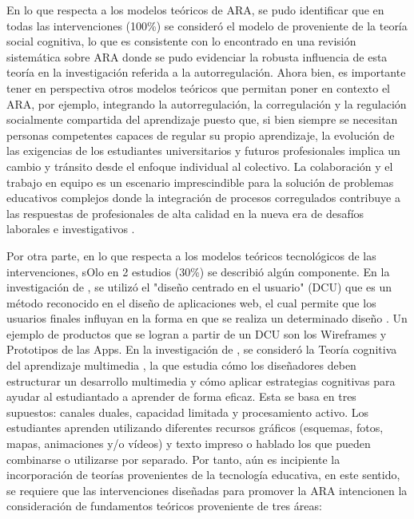 \documentclass[spanish]{textolivre}
\begin{document}
En lo que respecta a los modelos teóricos de ARA, se pudo identificar que en todas las intervenciones (100\%) se consideró el modelo de \textcite{zimmerman2000attaining} proveniente de la teoría social cognitiva, lo que es consistente con lo encontrado en una revisión sistemática sobre ARA donde se pudo evidenciar la robusta influencia de esta teoría en la investigación referida a la autorregulación. Ahora bien, es importante tener en perspectiva otros modelos teóricos que permitan poner en contexto el ARA, por ejemplo, integrando la autorregulación, la corregulación y la regulación socialmente compartida del aprendizaje puesto que, si bien siempre se necesitan personas competentes capaces de regular su propio aprendizaje, la evolución de las exigencias de los estudiantes universitarios y futuros profesionales implica un cambio y tránsito desde el enfoque individual al colectivo. La colaboración y el trabajo en equipo es un escenario imprescindible para la solución de problemas educativos complejos donde la integración de procesos corregulados contribuye a las respuestas de profesionales de alta calidad en la nueva era de desafíos laborales e investigativos \cite{bransen2022putting}. 

Por otra parte, en lo que respecta a los modelos teóricos tecnológicos de las intervenciones, sOlo en 2 estudios (30\%) se describió algún componente. En la investigación de \textcite{lobos2021design}, se utilizó el "diseño centrado en el usuario" (DCU) que es un método reconocido en el diseño de aplicaciones web, el cual permite que los usuarios finales influyan en la forma en que se realiza un determinado diseño \cite{williams2009user}. Un ejemplo de productos que se logran a partir de un DCU son los Wireframes y Prototipos de las Apps. En la investigación de \textcite{van2020new}, se consideró la Teoría cognitiva del aprendizaje multimedia \cite{mayer2003promise}, la que estudia cómo los diseñadores deben estructurar un desarrollo multimedia y cómo aplicar estrategias cognitivas para ayudar al estudiantado a aprender de forma eficaz. Esta se basa en tres supuestos: canales duales, capacidad limitada y procesamiento activo. Los estudiantes aprenden utilizando diferentes recursos gráficos (esquemas, fotos, mapas, animaciones y/o vídeos) y texto impreso o hablado los que pueden combinarse o utilizarse por separado. Por tanto, aún es incipiente la incorporación de teorías provenientes de la tecnología educativa, en este sentido, se requiere que las intervenciones diseñadas para promover la ARA intencionen la consideración de fundamentos teóricos proveniente de tres áreas: 
\end{document}
